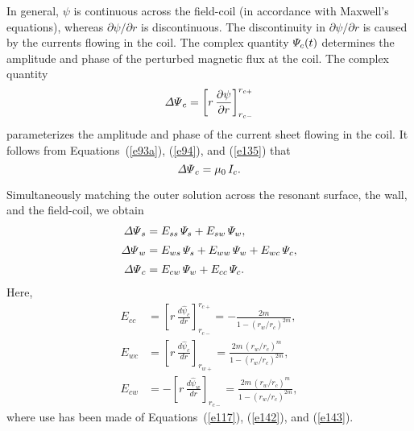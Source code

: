 \documentclass[notitlepage,12pt]{article}
\begin{document}
{In general, $\psi$ is continuous across the field-coil (in accordance with Maxwell's equations), whereas $\partial\psi/\partial r$ is discontinuous. The discontinuity in $\partial\psi/\partial r$ is caused by the currents flowing in the coil. The complex quantity ${\mit\Psi}_c(t)$ determines the amplitude and
phase of the perturbed magnetic flux at the coil. The complex quantity
\begin{equation}\label{e118a}
{\mit\Delta\Psi}_c = \left[r\,\frac{\partial\psi}{\partial r}\right]_{r_{c-}}^{r_{c+}}
\end{equation}
parameterizes the amplitude and phase of the current sheet flowing in the coil.
It follows from Equations~(\ref{e93a}), (\ref{e94}), and (\ref{e135})  that
\begin{equation}
{\mit\Delta\Psi}_c = \mu_0\,I_c.
\end{equation}

Simultaneously matching the outer solution across the resonant surface, the wall, and the field-coil, we
obtain
\begin{align}\label{e146}
{\mit\Delta\Psi}_s &= E_{ss}\,{\mit\Psi}_s + E_{sw}\,{\mit\Psi}_w,\\[0.5ex]
{\mit\Delta\Psi}_w &= E_{ws}\,{\mit\Psi}_s + E_{ww}\,{\mit\Psi}_w + E_{wc}\,{\mit\Psi}_c,\\[0.5ex]
{\mit\Delta\Psi}_c&= E_{cw}\,{\mit\Psi}_w + E_{cc}\,{\mit\Psi}_c. \label{e148}
\end{align}
Here,  
\begin{align}
E_{cc} &= \left[r\,\frac{d\hat{\psi}_c}{dr}\right]_{r_{c-}}^{r_{c+}}=- \frac{2m}{1-(r_w/r_c)^{2m}},\\[0.5ex]
E_{wc}&= \left[r\,\frac{d\hat{\psi}_c}{dr}\right]_{r_{w+}} = \frac{2m\,(r_w/r_c)^m}{1-(r_w/r_c)^{2m}},\label{e150a}\\[0.5ex]
E_{cw}&=- \left[r\,\frac{d\hat{\psi}_w}{dr}\right]_{r_{c-}} = \frac{2m\,(r_w/r_c)^m}{1-(r_w/r_c)^{2m}},\label{e151}
\end{align}
where use has been made of Equations~(\ref{e117}), (\ref{e142}), and (\ref{e143}). 

}
\end{document}
